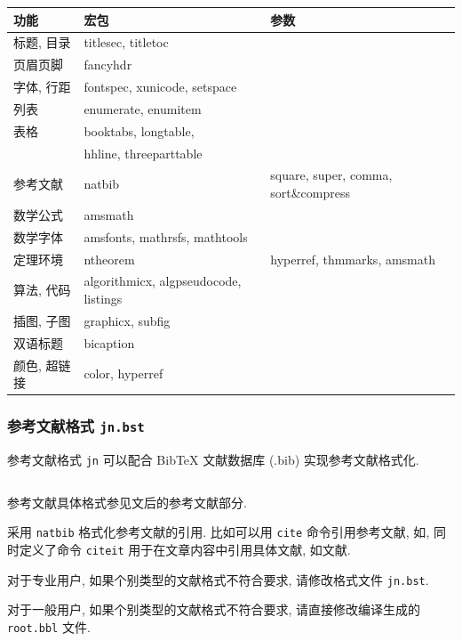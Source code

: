 \begin{tabular}{lll}
\hline
功能 & 宏包 & 参数\\
\hline
标题, 目录 & titlesec, titletoc &\\
页眉页脚 & fancyhdr &\\
字体, 行距 & fontspec, xunicode, setspace &\\
列表 & enumerate, enumitem\\
表格 & booktabs, longtable, &\\
& hhline, threeparttable & \\
参考文献 & natbib & square, super, comma, sort\&compress\\
\hline
数学公式 & amsmath & \\
数学字体 & amsfonts, mathrsfs, mathtools & \\
定理环境 & ntheorem & hyperref, thmmarks, amsmath\\
算法, 代码 & algorithmicx, algpseudocode, listings & \\
\hline
插图, 子图 & graphicx, subfig &\\
双语标题 & bicaption &\\
颜色, 超链接 & color, hyperref &\\
\hline
\end{tabular}


\subsubsection*{参考文献格式 {\tt{jn.bst}}}

参考文献格式 {\tt jn} 可以配合 BibTeX 文献数据库 (.bib) 实现参考文献格式化.

\begin{lstlisting}[basicstyle=\ttfamily, frame=single]
  % 指定参考文献格式
\end{lstlisting}

参考文献具体格式参见文后的参考文献部分\cite{Dupont1974,Aho1986,Chen1990,张全福1991,高景德1987,余勇1998,霍夫斯基1981,张竹生1983,竺可桢1973}.

采用 {\tt natbib} 格式化参考文献的引用.
比如可以用 {\tt cite} 命令引用参考文献,
如\cite{Dupont1974,Aho1986,Chen1990,竺可桢1973},
同时定义了命令 {\tt citeit} 用于在文章内容中引用具体文献,
如文献.

对于专业用户, 如果个别类型的文献格式不符合要求, 请修改格式文件 {\tt jn.bst}.

对于一般用户, 如果个别类型的文献格式不符合要求, 请直接修改编译生成的 {\tt root.bbl} 文件.

